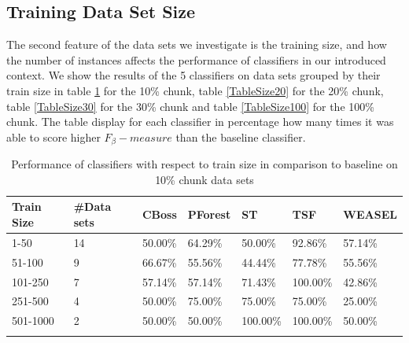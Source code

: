 

\subsection{Training Data Set Size}
The second feature of the data sets we investigate is the training size, and how the number of instances affects the performance of classifiers in our introduced context.
We show the results of the 5 classifiers on data sets grouped by their train size in table \ref{TableSize10} for the 10\% chunk, table \ref{TableSize20} for the 20\% chunk, table \ref{TableSize30} for the 30\% chunk and table \ref{TableSize100} for the 100\% chunk.
The table display for each classifier in percentage how many times it was able to score higher $F_{\beta}-measure$ than the baseline classifier.

\begin{table}[hbt!]
	\setlength\extrarowheight{2pt} %
	\begin{tabularx}{\textwidth}{|X|X|X|X|X|X|X|}
	\hline
	\textbf{Train Size} & \textbf{\#Data sets} & \textbf{CBoss} & \textbf{PForest} & \textbf{ST} & \textbf{TSF} & \textbf{WEASEL} \\ \hline
		1-50 & 14 & 50.00\% & 64.29\% & 50.00\% & 92.86\% & 57.14\% \\ \hline
		51-100 & 9 & 66.67\% & 55.56\% & 44.44\% & 77.78\% & 55.56\% \\ \hline
		101-250 & 7 & 57.14\% & 57.14\% & 71.43\% & 100.00\% & 42.86\% \\ \hline
		251-500 & 4 & 50.00\% & 75.00\% & 75.00\% & 75.00\% & 25.00\% \\ \hline
		501-1000 & 2 &50.00\% & 50.00\% & 100.00\% & 100.00\% & 50.00\% \\ \hline
	\caption{Performance of classifiers with respect to train size in comparison to baseline on 10\% chunk data sets}
	\label{TableSize10}
  \end{tabularx}
\end{table}

